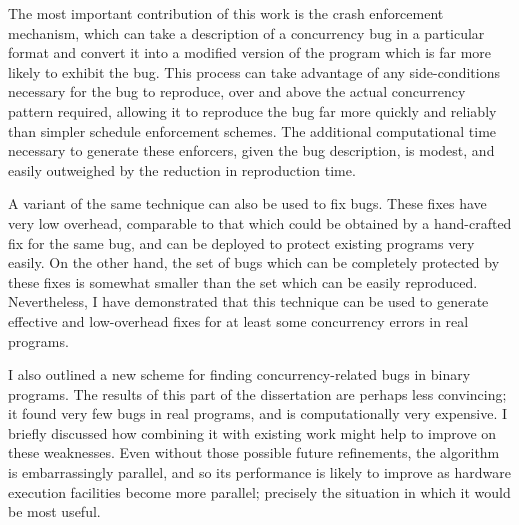 The most important contribution of this work is the crash enforcement
mechanism, which can take a description of a concurrency bug in a
particular format and convert it into a modified version of the
program which is far more likely to exhibit the bug.  This process can
take advantage of any side-conditions necessary for the bug to
reproduce, over and above the actual concurrency pattern required,
allowing it to reproduce the bug far more quickly and reliably than
simpler schedule enforcement schemes.  The additional computational
time necessary to generate these enforcers, given the bug description,
is modest, and easily outweighed by the reduction in reproduction
time.

A variant of the same technique can also be used to fix bugs.  These
fixes have very low overhead, comparable to that which could be
obtained by a hand-crafted fix for the same bug, and can be deployed
to protect existing programs very easily.  On the other hand, the set
of bugs which can be completely protected by these fixes is somewhat
smaller than the set which can be easily reproduced.  Nevertheless, I
have demonstrated that this technique can be used to generate
effective and low-overhead fixes for at least some concurrency errors
in real programs.

I also outlined a new scheme for finding concurrency-related bugs in
binary programs.  The results of this part of the dissertation are
perhaps less convincing; it found very few bugs in real programs, and
is computationally very expensive.  I briefly discussed how combining
it with existing work might help to improve on these weaknesses.  Even
without those possible future refinements, the algorithm is
embarrassingly parallel, and so its performance is likely to improve
as hardware execution facilities become more parallel; precisely the
situation in which it would be most useful.
